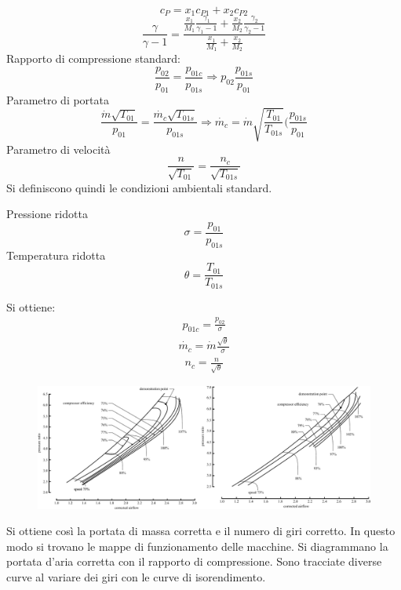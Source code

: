 \begin{equation}
c_P = x_1 c_{P1} + x_2 c_{P2}
\end{equation}
\begin{equation}
\frac{\gamma}{\gamma -1} = \frac{\frac{x_1}{M_1} \frac{\gamma_1}{\gamma_1 -1}+\frac{x_2}{M_2} \frac{\gamma_2}{\gamma_2 -1}}{\frac{x_1}{M_1}+\frac{x_2}{M_2}}
\end{equation}
Rapporto di compressione standard:
\begin{equation}
\frac{p_{02}}{p_{01}} = \frac{p_{01c}}{p_{01s}} \Rightarrow p_{02}\frac{p_{01s}}{p_{01}}
\end{equation}
Parametro di portata
\begin{equation}
\frac{\dot{m}\sqrt{T_{01}}}{p_{01}}=\frac{\dot{m_c}\sqrt{T_{01s}}}{p_{01s}} \Rightarrow \dot{m_c} = \dot{m} \sqrt{\frac{T_{01}}{T_{01s}}} (\frac{p_{01s}}{p_{01}}
\end{equation}
Parametro di velocità
\begin{equation}
\frac{n}{\sqrt{T_{01}}}=\frac{n_c}{\sqrt{T_{01s}}}
\end{equation}
Si definiscono quindi le condizioni ambientali standard.
\begin{multicols}{2}
Pressione ridotta
\begin{equation}
\sigma = \frac{p_{01}}{p_{01s}}
\end{equation}
Temperatura ridotta
\begin{equation}
\theta = \frac{T_{01}}{T_{01s}}
\end{equation}
\end{multicols}
Si ottiene:
\begin{align*}
p_{01c} = \frac{p_{02}}{\sigma}
\end{align*}
\begin{align*}
\dot{m_c}= \dot{m} \frac{\sqrt{\theta}}{\sigma}
\end{align*}
\begin{align*}
n_c = \frac{n}{\sqrt{\theta}}
\end{align*}
\begin{figure}
\centering
  \includegraphics[width=\textwidth]{fig/CompMaps.pdf}
\caption{}
\label{}
\end{figure}
Si ottiene così la portata di massa corretta e il numero di giri corretto.
In questo modo si trovano le mappe di funzionamento delle macchine. Si diagrammano la portata d'aria corretta con il rapporto di compressione. Sono tracciate diverse curve al variare dei giri con le curve di isorendimento.

